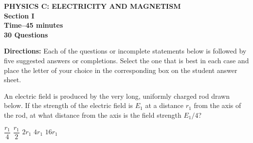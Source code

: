 \documentclass[12pt]{../oss-classkick-exam}
\begin{document}
\begin{center}
  \textbf{PHYSICS C: ELECTRICITY AND MAGNETISM\\
    Section I\\
    Time--45 minutes\\
    30 Questions
  }
\end{center}

\textbf{Directions:} Each of the questions or incomplete statements below is
followed by five suggested answers or completions. Select the one that is best
in each case and place the letter of your choice in the corresponding box on
the student answer sheet.

\begin{questions}
%
  
  \question An electric field is produced by the very long, uniformly charged
  rod drawn below. If the strength of the electric field is $E_1$ at a distance
  $r_1$ from the axis of the rod, at what distance from the axis is
  the field strength $E_1/4$?

  \vspace{.1in}
  \begin{minipage}{.35\linewidth}
  \end{minipage}
  \begin{minipage}{.4\linewidth}
    \begin{choices}
      \choice $\dfrac{r_1}4$
      \choice $\dfrac{r_1}2$
      \choice $2r_1$
      \choice $4r_1$
      \choice $16r_1$
    \end{choices}
  \end{minipage}
  


\end{questions}
\end{document}
